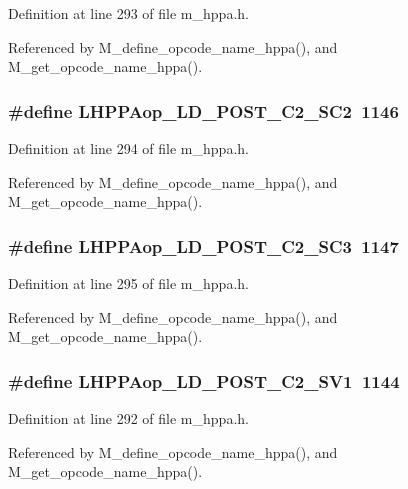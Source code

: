 Definition at line 293 of file m\_\-hppa.h.

Referenced by M\_\-define\_\-opcode\_\-name\_\-hppa(), and M\_\-get\_\-opcode\_\-name\_\-hppa().
\subsubsection{\setlength{\rightskip}{0pt plus 5cm}\#define LHPPAop\_\-LD\_\-POST\_\-C2\_\-SC2~1146}\label{m__hppa_8h_2d8c35398bcd55978afd2ded8d806ca8}




Definition at line 294 of file m\_\-hppa.h.

Referenced by M\_\-define\_\-opcode\_\-name\_\-hppa(), and M\_\-get\_\-opcode\_\-name\_\-hppa().
\subsubsection{\setlength{\rightskip}{0pt plus 5cm}\#define LHPPAop\_\-LD\_\-POST\_\-C2\_\-SC3~1147}\label{m__hppa_8h_6cd2bf57f4174f65ea964ea9682f855e}




Definition at line 295 of file m\_\-hppa.h.

Referenced by M\_\-define\_\-opcode\_\-name\_\-hppa(), and M\_\-get\_\-opcode\_\-name\_\-hppa().
\subsubsection{\setlength{\rightskip}{0pt plus 5cm}\#define LHPPAop\_\-LD\_\-POST\_\-C2\_\-SV1~1144}\label{m__hppa_8h_4794e7def869db5376ece7ea4c56c906}




Definition at line 292 of file m\_\-hppa.h.

Referenced by M\_\-define\_\-opcode\_\-name\_\-hppa(), and M\_\-get\_\-opcode\_\-name\_\-hppa().
